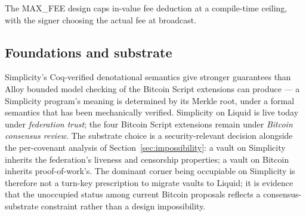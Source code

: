 The MAX\_FEE design caps in-value fee deduction at a compile-time
ceiling, with the signer choosing the actual fee at broadcast.

\subsection{Foundations and substrate}
\label{app:simplicity:foundations}

Simplicity's Coq-verified denotational semantics give stronger
guarantees than Alloy bounded model checking of the Bitcoin Script
extensions can produce --- a Simplicity program's meaning is
determined by its Merkle root, under a formal semantics that has
been mechanically verified. Simplicity on Liquid is live today under
\emph{federation trust}; the four Bitcoin Script extensions remain
under \emph{Bitcoin consensus review}. The substrate choice is a
security-relevant decision alongside the per-covenant analysis of
Section~\ref{sec:impossibility}: a vault on Simplicity inherits the
federation's liveness and censorship properties; a vault on Bitcoin
inherits proof-of-work's. The dominant corner being occupiable on
Simplicity is therefore not a turn-key prescription to migrate vaults
to Liquid; it is evidence that the unoccupied status among current
Bitcoin proposals reflects a consensus-substrate constraint rather
than a design impossibility.
